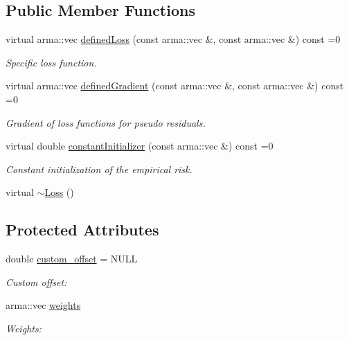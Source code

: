 \subsection*{Public Member Functions}
\begin{DoxyCompactItemize}
\item 
virtual arma\+::vec \mbox{\hyperlink{classloss_1_1_loss_ae9f94dd9b8311397583ba3a9cb485e94}{defined\+Loss}} (const arma\+::vec \&, const arma\+::vec \&) const =0
\begin{DoxyCompactList}\small\item\em Specific loss function. \end{DoxyCompactList}\item 
virtual arma\+::vec \mbox{\hyperlink{classloss_1_1_loss_a267a4de70747ade4b2d84ce35a448979}{defined\+Gradient}} (const arma\+::vec \&, const arma\+::vec \&) const =0
\begin{DoxyCompactList}\small\item\em Gradient of loss functions for pseudo residuals. \end{DoxyCompactList}\item 
virtual double \mbox{\hyperlink{classloss_1_1_loss_a65fe7dcd9370e6a549b8d1cc95fc8798}{constant\+Initializer}} (const arma\+::vec \&) const =0
\begin{DoxyCompactList}\small\item\em Constant initialization of the empirical risk. \end{DoxyCompactList}\item 
virtual \mbox{\hyperlink{classloss_1_1_loss_a868a7908fd97590b6c4fc69f4eb3c570}{$\sim$\+Loss}} ()
\end{DoxyCompactItemize}
\subsection*{Protected Attributes}
\begin{DoxyCompactItemize}
\item 
double \mbox{\hyperlink{classloss_1_1_loss_ae5dc373f54ed65ee0ca54a921ef826f4}{custom\+\_\+offset}} = N\+U\+LL
\begin{DoxyCompactList}\small\item\em Custom offset\+: \end{DoxyCompactList}\item 
arma\+::vec \mbox{\hyperlink{classloss_1_1_loss_a4cfecaa4e3a6244ec82651607340e751}{weights}}
\begin{DoxyCompactList}\small\item\em Weights\+: \end{DoxyCompactList}\end{DoxyCompactItemize}



